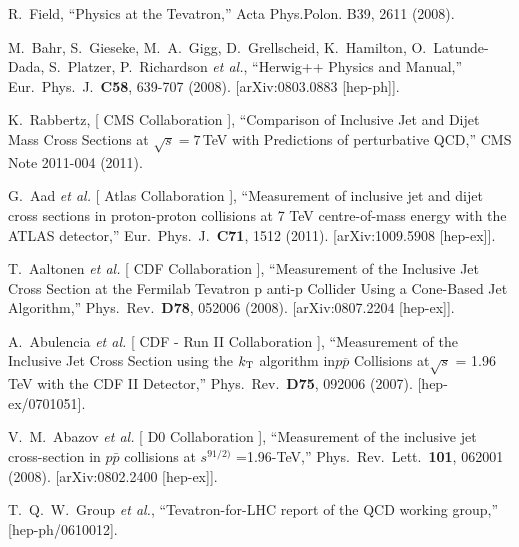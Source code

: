 \documentclass[11pt]{article}
\begin{document}
\begin{thebibliography}{99}
 R.~Field, 
 ``Physics at the Tevatron,''
  Acta Phys.Polon. B39, 2611 (2008).

  M.~Bahr, S.~Gieseke, M.~A.~Gigg, D.~Grellscheid, K.~Hamilton, O.~Latunde-Dada, S.~Platzer, P.~Richardson {\it et al.},
  ``Herwig++ Physics and Manual,''
  Eur.\ Phys.\ J.\  {\bf C58}, 639-707 (2008).
  [arXiv:0803.0883 [hep-ph]].


K.~Rabbertz, [ CMS Collaboration ],
 ``Comparison of Inclusive Jet and Dijet Mass Cross Sections at $\sqrt{s}
    = 7\,$TeV with Predictions of perturbative QCD,''
  CMS Note 2011-004 (2011).

  G.~Aad {\it et al.} [ Atlas Collaboration ],
  ``Measurement of inclusive jet and dijet cross sections in proton-proton collisions at 7 TeV centre-of-mass energy with the ATLAS detector,''
  Eur.\ Phys.\ J.\  {\bf C71}, 1512 (2011).
  [arXiv:1009.5908 [hep-ex]].




  T.~Aaltonen {\it et al.} [ CDF Collaboration ],
  ``Measurement of the Inclusive Jet Cross Section at the Fermilab Tevatron p anti-p Collider Using a Cone-Based Jet Algorithm,''
  Phys.\ Rev.\  {\bf D78}, 052006 (2008).
  [arXiv:0807.2204 [hep-ex]].

  A.~Abulencia {\it et al.} [ CDF - Run II Collaboration ],
  ``Measurement of the Inclusive Jet Cross Section using the {\boldmath $k_{\rm T}$} algorithm in{\boldmath $p\overline{p}$} Collisions at{\boldmath $\sqrt{s}$} = 1.96 TeV with the CDF II Detector,''
  Phys.\ Rev.\  {\bf D75}, 092006 (2007).
  [hep-ex/0701051].

  V.~M.~Abazov {\it et al.} [ D0 Collaboration ],
  ``Measurement of the inclusive jet cross-section in $p \bar{p}$ collisions at $s^{91/2)}$ =1.96-TeV,''
  Phys.\ Rev.\ Lett.\  {\bf 101}, 062001 (2008).
  [arXiv:0802.2400 [hep-ex]].


  T.~Q.~W.~Group {\it et al.},
  ``Tevatron-for-LHC report of the QCD working group,''
  [hep-ph/0610012].





\end{thebibliography}
\end{document}
